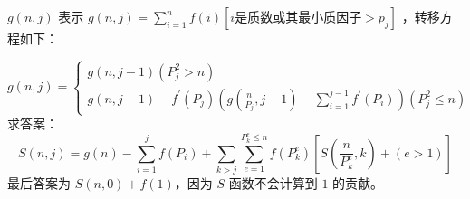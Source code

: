 $g(n, j)$ 表示 $g(n,j)=\sum_{i=1}^nf(i)[i\text{是质数或其最小质因子}>p_j]$ ，转移方程如下：

$$g(n,j)=\begin{cases}g(n,j-1)(P_j^2>n)\\g(n,j-1)-f^{\prime}(P_j)(g(\frac n{P_j},j-1)-\sum_{i=1}^{j-1}f^{\prime}(P_i))(P_j^2\leq n)&\end{cases}$$
求答案：
$$S(n,j)=g(n)-\sum_{i=1}^jf(P_i)+\sum_{k>j}\sum_{e=1}^{P_k^e\leq n}f(P_k^e)[S(\frac n{P_k^e},k)+(e>1)]$$
最后答案为 $S(n,0) + f(1)$，因为 $S$ 函数不会计算到 $1$ 的贡献。 

